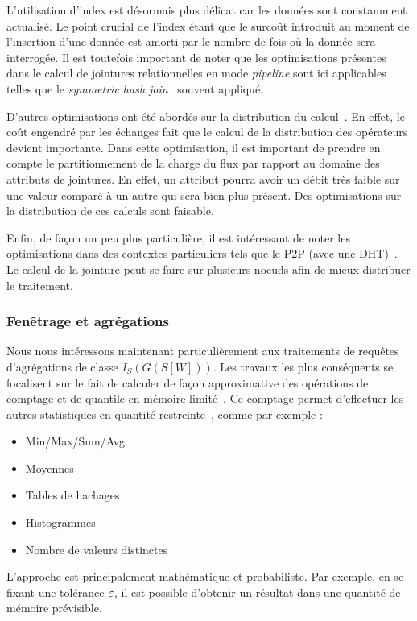 L'utilisation d'index est désormais plus délicat car les données sont constamment actualisé. Le point crucial de l'index étant que le surcoût introduit au moment de l'insertion d'une donnée est amorti par le nombre de fois où la donnée sera interrogée. Il est toutefois important de noter que les optimisations présentes dans le calcul de jointures relationnelles en mode \textit{pipeline} sont ici applicables telles que le \textit{symmetric hash join}~\cite{Wilschut:symetricjoin} souvent appliqué.

D'autres optimisations ont été abordés sur la distribution du calcul~\cite{Zhou:pmjoin}. En effet, le coût engendré par les échanges fait que le calcul de la distribution des opérateurs devient importante. Dans cette optimisation, il est important de prendre en compte le partitionnement de la charge du flux par rapport au domaine des attributs de jointures. En effet, un attribut pourra avoir un débit très faible sur une valeur comparé à un autre qui sera bien plus présent. Des optimisations sur la distribution de ces calculs sont faisable.

Enfin, de façon un peu plus particulière, il est intéressant de noter les optimisations dans des contextes particuliers tels que le P2P (avec une DHT)~\cite{Palma:p2p}. Le calcul de la jointure peut se faire sur plusieurs noeuds afin de mieux distribuer le traitement.

\subsubsection{Fenêtrage et agrégations}
Nous nous intéressons maintenant particulièrement aux traitements de requêtes d'agrégations de classe $I_S(G(S[W]))$. Les travaux les plus conséquents se focalisent sur le fait de calculer de façon approximative des opérations de comptage et de quantile en mémoire limité~\cite{Arasu:window}. Ce comptage permet d'effectuer les autres statistiques en quantité restreinte~\cite{Datar:stats}, comme par exemple : 
\begin{itemize}
 \item Min/Max/Sum/Avg 
 \item Moyennes
 \item Tables de hachages
 \item Histogrammes
 \item Nombre de valeurs distinctes
\end{itemize}

L'approche est principalement mathématique et probabiliste. Par exemple, en se fixant une tolérance $\varepsilon$, il est possible d'obtenir un résultat dans une quantité de mémoire prévisible.

